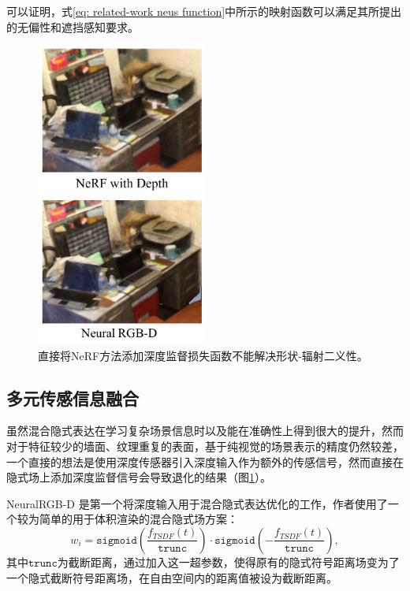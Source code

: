 可以证明，式\ref{eq: related-work neus function}中所示的映射函数可以满足其所提出的无偏性和遮挡感知要求。

\begin{figure}[ht]
    \centering
    \includegraphics[width=0.5\textwidth]{undergraduate-thesis/images/neural-rgbd comparison with NeRF.png}
    \caption{直接将NeRF方法添加深度监督损失函数不能解决形状-辐射二义性。}
    \label{fig:related-work neural-rgbd comparison with NeRF}
\end{figure}

\subsection{多元传感信息融合}
虽然混合隐式表达在学习复杂场景信息时以及能在准确性上得到很大的提升，然而对于特征较少的墙面、纹理重复的表面，基于纯视觉的场景表示的精度仍然较差，一个直接的想法是使用深度传感器\cite{zabatani_intel_2020}引入深度输入作为额外的传感信号，然而直接在隐式场上添加深度监督信号会导致退化的结果（图\ref{fig:related-work neural-rgbd comparison with NeRF}）。

NeuralRGB-D 是第一个将深度输入用于混合隐式表达优化的工作\cite{azinovic_neural_2022}，作者使用了一个较为简单的用于体积渲染的混合隐式场方案：
\begin{equation}
    w_i = \mathtt{sigmoid}\left(\frac{f_{TSDF}(t)}{\mathtt{trunc}}\right)\cdot\mathtt{sigmoid}\left(-\frac{f_{TSDF}(t)}{\mathtt{trunc}}\right),
\end{equation}
其中$\mathtt{trunc}$为截断距离，通过加入这一超参数，使得原有的隐式符号距离场变为了一个隐式截断符号距离场，在自由空间内的距离值被设为截断距离。


